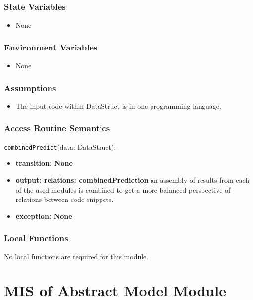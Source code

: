 \documentclass[12pt, titlepage]{article}
\begin{document}
\subsubsection{State Variables}

\begin{itemize}
    \item None
\end{itemize}

\subsubsection{Environment Variables}

\begin{itemize}
  \item None
\end{itemize}

\subsubsection{Assumptions}

\begin{itemize}
    \item The input code within DataStruct is in one programming language.
\end{itemize}

\subsubsection{Access Routine Semantics}
\noindent \texttt{combinedPredict}(data: DataStruct):
\begin{itemize}
    \item \textbf{transition: None} 
    \item \textbf{output: relations: combinedPrediction} an assembly of results 
    from each of the used modules is combined to get a more balanced perspective of relations between code snippets.
    \item \textbf{exception: None}
\end{itemize}

\subsubsection{Local Functions}
No local functions are required for this module.



\section{MIS of Abstract Model Module} \label{AbModelModule}
\end{document}
